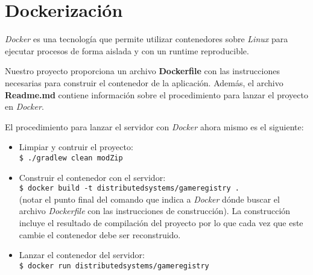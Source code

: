 \section{Dockerización}
\emph{Docker} es una tecnología que permite utilizar contenedores sobre \emph{Linux} para
ejecutar procesos de forma aislada y con un runtime reproducible.

Nuestro proyecto proporciona un archivo \textbf{Dockerfile} con las instrucciones necesarias
para construir el contenedor de la aplicación. Además, el archivo \textbf{Readme.md} contiene
información sobre el procedimiento para lanzar el proyecto en \emph{Docker}. 

El procedimiento para lanzar el servidor con \emph{Docker} ahora mismo es el siguiente:

\begin{itemize}
 \item Limpiar y contruir el proyecto: \\
       \texttt{\$ ./gradlew clean modZip}
 \item Construir el contenedor con el servidor: \\
       \texttt{\$ docker build -t distributedsystems/gameregistry .} \\
       (notar el punto final del comando que indica a \emph{Docker} dónde buscar el archivo
       \emph{Dockerfile} con las instrucciones de construcción). La construcción incluye el 
       resultado de compilación del proyecto por lo que cada vez que este cambie el contenedor
       debe ser reconstruido.
 \item Lanzar el contenedor del servidor: \\
       \texttt{\$ docker run distributedsystems/gameregistry}
\end{itemize}
